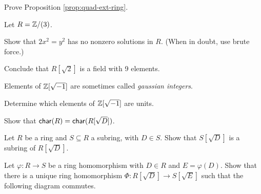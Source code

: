 \Exercises%

\begin{exercise}
Prove Proposition \ref{prop:quad-ext-ring}.
\end{exercise}

\begin{exercise}
Let \(R = \mathbb{Z}/(3)\).
\begin{proplist}
\item Show that \(2x^2 = y^2\) has no nonzero solutions in \(R\). (When in doubt, use brute force.)
\item Conclude that \(R[\sqrt{2}]\) is a field with 9 elements.
\end{proplist}
\end{exercise}

\begin{exercise}
Elements of \(\mathbb{Z}[\sqrt{-1}]\) are sometimes called \emph{gaussian integers}.
\begin{proplist}
\item Determine which elements of \(\mathbb{Z}[\sqrt{-1}]\) are units.
\end{proplist}
\end{exercise}

\begin{exercise}
Show that \(\mathsf{char}(R) = \mathsf{char}(R[\sqrt{D}])\).
\end{exercise}

\begin{exercise}
Let \(R\) be a ring and \(S \subseteq R\) a subring, with \(D \in S\). Show that \(S[\sqrt{D}]\) is a subring of \(R[\sqrt{D}]\).
\end{exercise}

\begin{exercise}
Let \(\varphi : R \rightarrow S\) be a ring homomorphism with \(D \in R\) and \(E = \varphi(D)\). Show that there is a unique ring homomorphism \(\Phi : R[\sqrt{D}] \rightarrow S[\sqrt{E}]\) such that the following diagram commutes.
\begin{center}
\end{center}
\end{exercise}
